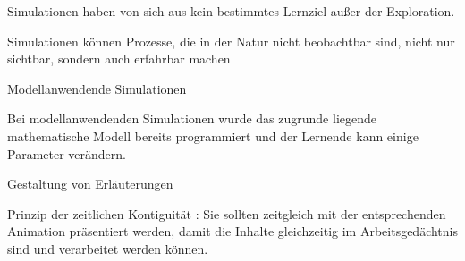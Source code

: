 Simulationen  haben  von  sich  aus  kein  bestimmtes  Lernziel  außer  der  Exploration. 

Simulationen  können  Prozesse,  die  in  der  Natur  nicht  beobachtbar  sind,  nicht  nur 
sichtbar, sondern auch erfahrbar machen

Modellanwendende Simulationen 

Bei  modellanwendenden  Simulationen  wurde  das  zugrunde  liegende  mathematische 
Modell bereits programmiert und der Lernende kann einige Parameter verändern. 

Gestaltung von Erläuterungen 

Prinzip der zeitlichen Kontiguität :
Sie sollten zeitgleich mit der entsprechenden Animation präsentiert werden, damit die 
Inhalte gleichzeitig im Arbeitsgedächtnis sind und verarbeitet werden können.